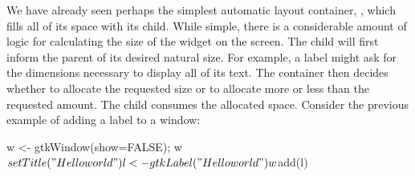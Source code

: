 We have already seen perhaps the simplest automatic layout container,
, which fills all of its space with its child. While
simple, there is a considerable amount of logic for calculating the
size of the widget on the screen. The child will first inform the
parent of its desired natural size. For example, a label might ask for
the dimensions necessary to display all of its text. The container
then decides whether to allocate the requested size or to allocate
more or less than the requested amount. The child consumes the
allocated space. Consider the previous example of adding a label to a
window:
\begin{Schunk}
\begin{Sinput}
 w <- gtkWindow(show=FALSE); w$setTitle("Hello world")
 l <- gtkLabel("Hello world")
 w$add(l)
\end{Sinput}
\end{Schunk}

